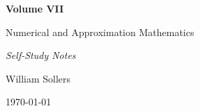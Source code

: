 \begin{titlepage}
\centering

\vspace*{5cm}

{\Huge\bfseries Volume VII\par}

\vspace{0.5cm}

{\LARGE Numerical and Approximation Mathematics\par}

\vspace{0.5cm}

{\large\itshape Self-Study Notes\par}

\vfill

{\large William Sollers\par}

\vspace{0.5cm}

{\large \today\par}

\end{titlepage}

